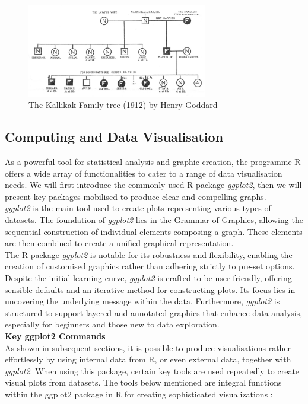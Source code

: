 \documentclass{article}\usepackage[]{graphicx}\usepackage[]{xcolor}
\numberwithin{equation}{section}
\begin{document}
\begin{figure}[H]
    \centering
    \includegraphics[width=0.7\textwidth]{image_reference/familytree.jpg}
    \caption{The Kallikak Family tree (1912) by Henry Goddard \cite{ktree}}
    \label{fig:familytree}
\end{figure}

\subsection{Computing and Data Visualisation}
\noindent
As a powerful tool for statistical analysis and graphic creation, the programme R offers a wide array of functionalities to cater to a range of data visualisation needs. We will first introduce the commonly used R package \textit{ggplot2}, then we will present key packages mobilised to produce clear and compelling graphs.\\

\noindent
\textit{ggplot2} is the main tool used to create plots representing various types of datasets. The foundation of \textit{ggplot2} lies in the Grammar of Graphics, allowing the sequential construction of individual elements composing a graph. These elements are then combined to create a unified graphical representation.\\

\noindent
The R package \textit{ggplot2} is notable for its robustness and flexibility, enabling the creation of customised graphics rather than adhering strictly to pre-set options. Despite the initial learning curve, \textit{ggplot2} is crafted to be user-friendly, offering sensible defaults and an iterative method for constructing plots. Its focus lies in uncovering the underlying message within the data. Furthermore, \textit{ggplot2} is structured to support layered and annotated graphics that enhance data analysis, especially for beginners and those new to data exploration.\\

\noindent\textbf{Key ggplot2 Commands}\\
\noindent 
As shown in subsequent sections, it is possible to produce visualisations rather effortlessly by using internal data from R, or even external data, together with \textit{ggplot2}. When using this package, certain key tools are used repeatedly to create visual plots from datasets. The tools below mentioned are integral functions within the ggplot2 package in R for creating sophisticated visualizations \cite{ggplot2}:\\
\end{document}
